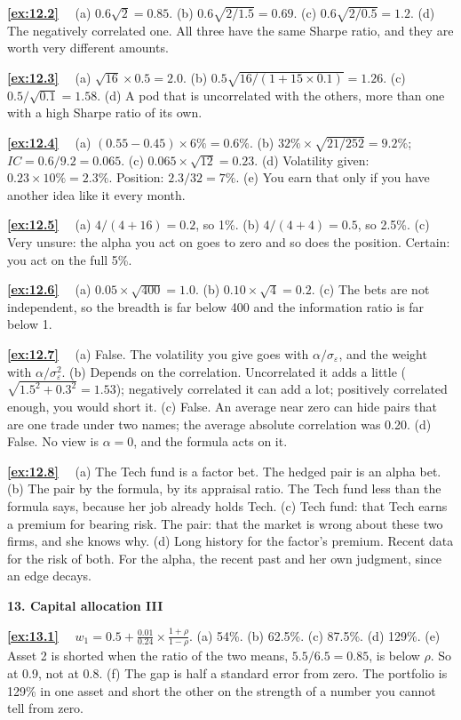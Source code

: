 \documentclass[11pt]{article}
\newcounter{ex}[section]
\newcommand{\sol}[1]{\par\smallskip\textbf{\ref{#1}}\ \ }
\newcommand{\head}[1]{\par\medskip\textbf{#1}\par}
\begin{document}
{\sol{ex:12.2} (a) $0.6\sqrt{2} = 0.85$. (b) $0.6\sqrt{2/1.5} = 0.69$. (c) $0.6\sqrt{2/0.5} = 1.2$. (d) The negatively
correlated one. All three have the same Sharpe ratio, and they are worth very different amounts.

\sol{ex:12.3} (a) $\sqrt{16}\times 0.5 = 2.0$. (b) $0.5\sqrt{16/(1 + 15\times 0.1)} = 1.26$. (c) $0.5/\sqrt{0.1} = 1.58$. (d) A
pod that is uncorrelated with the others, more than one with a high Sharpe ratio of its own.

\sol{ex:12.4} (a) $(0.55 - 0.45)\times 6\% = 0.6\%$. (b) $32\%\times\sqrt{21/252} = 9.2\%$; $IC = 0.6/9.2 = 0.065$. (c)
$0.065\times\sqrt{12} = 0.23$. (d) Volatility given: $0.23\times 10\% = 2.3\%$. Position: $2.3/32 = 7\%$. (e) You earn that
only if you have another idea like it every month.

\sol{ex:12.5} (a) $4/(4 + 16) = 0.2$, so 1\%. (b) $4/(4 + 4) = 0.5$, so 2.5\%. (c) Very unsure: the alpha you act on goes
to zero and so does the position. Certain: you act on the full 5\%.

\sol{ex:12.6} (a) $0.05\times\sqrt{400} = 1.0$. (b) $0.10\times\sqrt{4} = 0.2$. (c) The bets are not independent, so the
breadth is far below 400 and the information ratio is far below 1.

\sol{ex:12.7} (a) False. The volatility you give goes with $\alpha/\sigma_{\varepsilon}$, and the weight with
$\alpha/\sigma_{\varepsilon}^{2}$. (b) Depends on the correlation. Uncorrelated it adds a little ($\sqrt{1.5^{2} + 0.3^{2}} =
1.53$); negatively correlated it can add a lot; positively correlated enough, you would short it. (c) False. An average
near zero can hide pairs that are one trade under two names; the average absolute correlation was 0.20. (d) False. No
view is $\alpha = 0$, and the formula acts on it.

\sol{ex:12.8} (a) The Tech fund is a factor bet. The hedged pair is an alpha bet. (b) The pair by the formula, by its
appraisal ratio. The Tech fund less than the formula says, because her job already holds Tech. (c) Tech fund: that
Tech earns a premium for bearing risk. The pair: that the market is wrong about these two firms, and she knows why.
(d) Long history for the factor's premium. Recent data for the risk of both. For the alpha, the recent past and her own
judgment, since an edge decays.

\head{13. Capital allocation III}

\sol{ex:13.1} $w_{1} = 0.5 + \frac{0.01}{0.24}\times\frac{1+\rho}{1-\rho}$. (a) 54\%. (b) 62.5\%. (c) 87.5\%. (d) 129\%.
(e) Asset 2 is shorted when the ratio of the two means, $5.5/6.5 = 0.85$, is below $\rho$. So at 0.9, not at 0.8.
(f) The gap is half a standard error from zero. The portfolio is 129\% in one asset and short the other on the strength
of a number you cannot tell from zero.

}
\end{document}
